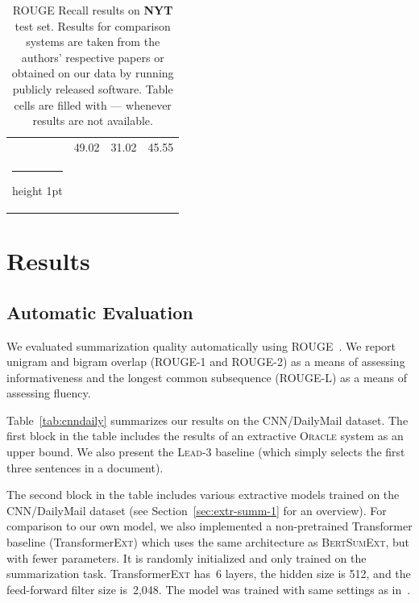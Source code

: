 \documentclass[11pt,a4paper]{article}
\makeatletter
\newcommand{\thickhline}{%
    \noalign {\ifnum 0=`}\fi \hrule height 1pt
    \futurelet \reserved@a \@xhline
}
\makeatother
\begin{document}
\begin{table}[t]
\begin{small}
\begin{tabular}{lccc@{}}
                & 49.02 &31.02& 45.55 \\ \thickhline
            \end{tabular}
        \end{small}
        \caption{\label{tab:nyt} ROUGE Recall results on  \textbf{NYT} test set. Results for comparison systems are
            taken from the authors' respective papers or obtained on our data by running publicly released software. Table
            cells are filled with --- whenever results are not available.} 
    \end{table}
    
    
    
    
    
    \section{Results}
    \label{sec:results}
    
    \subsection{Automatic Evaluation}
    
    We evaluated summarization quality automatically using ROUGE~\cite{lin:2004:ACLsummarization}.  We report unigram and bigram overlap (ROUGE-1
    and ROUGE-2) as a means of assessing informativeness and the longest
    common subsequence (ROUGE-L) as a means of assessing
    fluency. 
    
    
    
    
    
    
    Table~\ref{tab:cnndaily} summarizes our results on the CNN/DailyMail
    dataset.  The first block in the table includes the results of an
    extractive \textsc{Oracle} system as an upper bound.  We also present the \textsc{Lead-3} baseline
    (which simply selects the first three sentences in a document).
    
    The second block in the table includes various extractive models
    trained on the CNN/DailyMail dataset (see
    Section~\ref{sec:extr-summ-1} for an overview). For comparison to our
    own model, we also implemented a non-pretrained Transformer baseline
    (Transformer\textsc{Ext}) which uses the same architecture as
    \textsc{BertSumExt}, but with fewer parameters. It is randomly initialized
    and only trained on the summarization task. Transformer\textsc{Ext}
    has~6 layers, the hidden size is 512, and the feed-forward filter size
    is~2,048. The model was trained with same settings as
    in~\citet{vaswani2017attention}.
    
\end{document}
